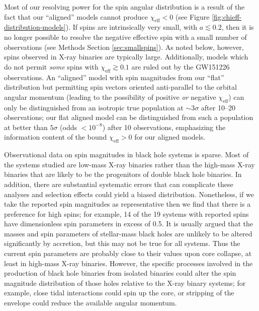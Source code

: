 \documentclass{nature}
\newcommand{\chieff}{\chi_\mathrm{eff}}
\begin{document}
Most of our resolving power for the spin angular distribution is a
result of the fact that our ``aligned'' models cannot produce
$\chieff < 0$ (see Figure \ref{fig:chieff-distribution-models}).  If
spins are intrinsically very small, with $a \lesssim 0.2$, then it is
no longer possible to resolve the negative effective spin with a small
number of observations (see Methods Section \ref{sec:smallspins}).  As
noted below, however, spins observed in X-ray binaries are typically
large.  Additionally, models which do not permit \emph{some} spins
with $\chieff \gtrsim 0.1$ are ruled out by the GW151226
observations\cite{2016PhRvL.116x1103A}.  An ``aligned'' model with
spin magnitudes from our ``flat'' distribution but permitting spin
vectors oriented anti-parallel to the orbital angular momentum
(leading to the possibility of positive \emph{or} negative $\chieff$)
can only be distinguished from an isotropic true population at
$\sim 3 \sigma$ after 10--20 observations\cite{2017CQGra..34cLT01V};
our flat aligned model can be distinguished from such a population at
better than $5\sigma$ (odds $< 10^{-8}$) after 10 observations,
emphasizing the information content of the bound $\chieff > 0$ for our
aligned models.

Observational data on spin magnitudes in black hole systems is
sparse\cite{2015PhR...548....1M}.  Most of the systems studied are
low-mass X-ray binaries rather than the high-mass X-ray binaries that
are likely to be the progenitors of double black hole binaries.  In
addition, there are substantial systematic errors that can complicate
these analyses\cite{2015PhR...548....1M} and selection effects could
yield a biased distribution. Nonetheless, if we take the reported spin
magnitudes as representative then we find that there is a preference
for high spins; for example, 14 of the 19 systems with reported spins
have dimensionless spin parameters in excess of 0.5.  It is usually
argued that the masses and spin parameters of stellar-mass black holes
are unlikely to be altered significantly by
accretion\cite{1999MNRAS.305..654K}, but this may not be true for all
systems\cite{2015ApJ...800...17F}.  Thus the current spin parameters
are probably close to their values upon core collapse, at least in
high-mass X-ray binaries.  However, the specific processes involved in
the production of black hole binaries from isolated binaries could
alter the spin magnitude distribution of those holes relative to the
X-ray binary systems; for example, close tidal interactions could spin
up the core, or stripping of the envelope could reduce the available
angular
momentum\cite{2016MNRAS.462..844K,2017arXiv170200885Z,2017arXiv170203952H}.
\end{document}
